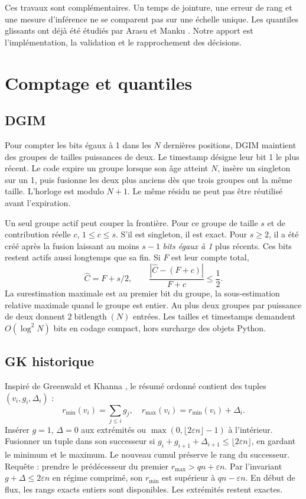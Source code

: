 \documentclass[11pt,a4paper,twocolumn]{article}
\begin{document}
Ces travaux sont complémentaires. Un temps de jointure, une erreur de rang et une mesure d’inférence ne se comparent pas sur une échelle unique. Les quantiles glissants ont déjà été étudiés par Arasu et Manku \cite{arasu2004}. Notre apport est l’implémentation, la validation et le rapprochement des décisions.
\clearpage
\section{Comptage et quantiles}
\subsection{DGIM}
Pour compter les bits égaux à 1 dans les $N$ dernières positions, DGIM \cite{datar2002} maintient des groupes de tailles puissances de deux. Le timestamp désigne leur bit 1 le plus récent. Le code expire un groupe lorsque son âge atteint $N$, insère un singleton sur un 1, puis fusionne les deux plus anciens dès que trois groupes ont la même taille. L’horloge est modulo $N+1$. Le même résidu ne peut pas être réutilisé avant l’expiration.

Un seul groupe actif peut couper la frontière. Pour ce groupe de taille $s$ et de contribution réelle $c$, $1\le c\le s$. S’il est singleton, il est exact. Pour $s\ge2$, il a été créé après la fusion laissant au moins $s-1$ \emph{bits égaux à 1} plus récents. Ces bits restent actifs aussi longtemps que sa fin. Si $F$ est leur compte total,
\begin{equation}
\widehat C=F+s/2,\qquad
\frac{|\widehat C-(F+c)|}{F+c}\le\frac12 .
\end{equation}
La surestimation maximale est au premier bit du groupe, la sous-estimation relative maximale quand le groupe est entier. Au plus deux groupes par puissance de deux donnent $2\operatorname{bitlength}(N)$ entrées. Les tailles et timestamps demandent $O(\log^2N)$ bits en codage compact, hors surcharge des objets Python.

\subsection{GK historique}
Inspiré de Greenwald et Khanna \cite{gk2001}, le résumé ordonné contient des tuples $(v_i,g_i,\Delta_i)$ :
\begin{equation}
r_{\min}(v_i)=\textstyle\sum_{j\le i}g_j,\quad
r_{\max}(v_i)=r_{\min}(v_i)+\Delta_i.
\end{equation}
Insérer $g=1$, $\Delta=0$ aux extrémités ou $\max(0,\lfloor2\varepsilon n\rfloor-1)$ à l’intérieur. Fusionner un tuple dans son successeur si $g_i+g_{i+1}+\Delta_{i+1}\le\lfloor2\varepsilon n\rfloor$, en gardant le minimum et le maximum. Le nouveau cumul préserve le rang du successeur. Requête : prendre le prédécesseur du premier $r_{\max}>qn+\varepsilon n$. Par l’invariant $g+\Delta\le2\varepsilon n$ en régime comprimé, son $r_{\min}$ est supérieur à $qn-\varepsilon n$. En début de flux, les rangs exacts entiers sont disponibles. Les extrémités restent exactes.
\end{document}
